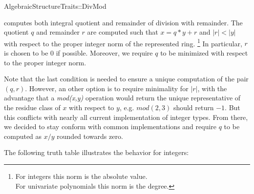 \begin{ccRefFunctionObjectConcept}{AlgebraicStructureTraits::DivMod}

\ccDefinition

 computes both integral quotient and remainder
of division with remainder. The quotient $q$ and remainder $r$ are computed 
such that $x = q*y + r$ and $|r| < |y|$ with respect to the proper integer norm of 
the represented ring.
\footnote{
For integers this norm is the absolute value.\\ 
For univariate polynomials this norm is the degree.} 
In particular, $r$ is chosen to be $0$ if possible.
Moreover, we require $q$ to be minimized with respect to the proper integer norm.  



Note that the last condition is needed to ensure a unique computation of the 
pair $(q,r)$. However, an other option is to require minimality for $|r|$, 
with the advantage that
a {\em mod(x,y)} operation would return the unique representative of the 
residue class of $x$ with respect to $y$, e.g. $mod(2,3)$ should return $-1$. 
But this conflicts with nearly all current implementation 
of integer types. From there, we decided to stay conform with common 
implementations and require $q$ to be computed as $x/y$ rounded towards zero. 


The following truth table illustrates the behavior for integers: 


\end{ccRefFunctionObjectConcept}
